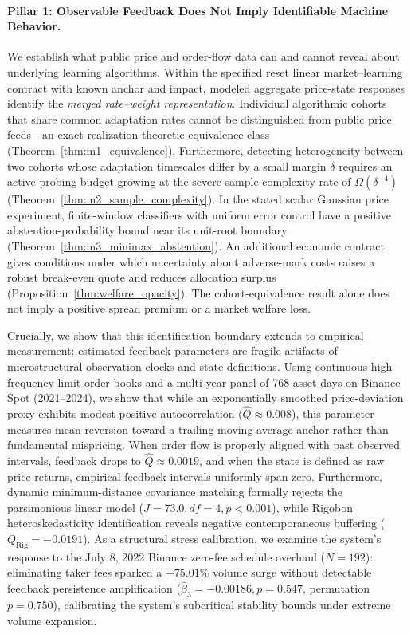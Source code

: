 \documentclass[12pt]{article}
\theoremstyle{definition}
\theoremstyle{remark}
\begin{document}
\paragraph{Pillar 1: Observable Feedback Does Not Imply Identifiable Machine Behavior.}
We establish what public price and order-flow data can and cannot reveal about underlying learning algorithms. Within the specified reset linear market--learning contract with known anchor and impact, modeled aggregate price-state responses identify the \emph{merged rate--weight representation}. Individual algorithmic cohorts that share common adaptation rates cannot be distinguished from public price feeds—an exact realization-theoretic equivalence class (Theorem~\ref{thm:m1_equivalence}). Furthermore, detecting heterogeneity between two cohorts whose adaptation timescales differ by a small margin $\delta$ requires an active probing budget growing at the severe sample-complexity rate of $\Omega(\delta^{-4})$ (Theorem~\ref{thm:m2_sample_complexity}). In the stated scalar Gaussian price experiment, finite-window classifiers with uniform error control have a positive abstention-probability bound near its unit-root boundary (Theorem~\ref{thm:m3_minimax_abstention}). An additional economic contract gives conditions under which uncertainty about adverse-mark costs raises a robust break-even quote and reduces allocation surplus (Proposition~\ref{thm:welfare_opacity}). The cohort-equivalence result alone does not imply a positive spread premium or a market welfare loss.

Crucially, we show that this identification boundary extends to empirical measurement: estimated feedback parameters are fragile artifacts of microstructural observation clocks and state definitions. Using continuous high-frequency limit order books and a multi-year panel of 768 asset-days on Binance Spot (2021--2024), we show that while an exponentially smoothed price-deviation proxy exhibits modest positive autocorrelation ($\hat{Q} \approx 0.008$), this parameter measures mean-reversion toward a trailing moving-average anchor rather than fundamental mispricing. When order flow is properly aligned with past observed intervals, feedback drops to $\hat{Q} \approx 0.0019$, and when the state is defined as raw price returns, empirical feedback intervals uniformly span zero. Furthermore, dynamic minimum-distance covariance matching formally rejects the parsimonious linear model ($J = 73.0, df = 4, p < 0.001$), while Rigobon heteroskedasticity identification reveals negative contemporaneous buffering ($Q_{\text{Rig}} = -0.0191$). As a structural stress calibration, we examine the system's response to the July 8, 2022 Binance zero-fee schedule overhaul ($N=192$): eliminating taker fees sparked a $+75.01\%$ volume surge without detectable feedback persistence amplification ($\hat{\beta}_3 = -0.00186, p = 0.547$, permutation $p = 0.750$), calibrating the system's subcritical stability bounds under extreme volume expansion.
\end{document}
